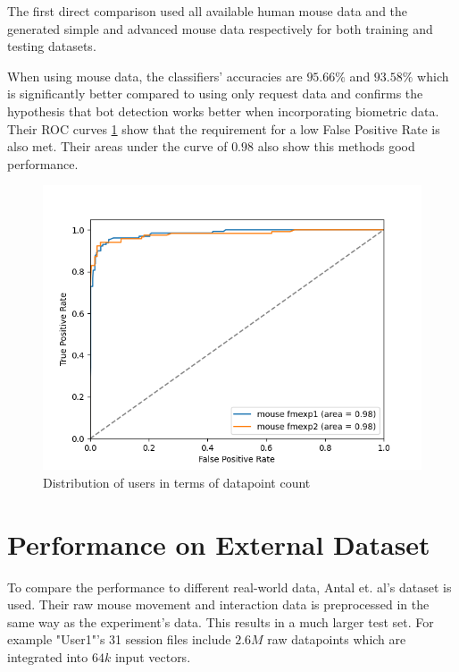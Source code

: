 \documentclass[
    fontsize=12pt,
    headings=small,
    parskip=half,           %
    bibliography=totoc,
    numbers=noenddot,       %
    open=any,               %
    final,                   %
    table
]{scrreprt}
\begin{document}
The first direct comparison used all available human mouse data and the generated simple and advanced mouse data respectively for both training and testing datasets. 

When using mouse data, the classifiers' accuracies are $95.66\%$ and $93.58\%$ which is significantly better compared to using only request data and confirms the hypothesis that bot detection works better when incorporating biometric data. Their ROC curves \ref{fig:roc_mouse_both_instances} show that the requirement for a low False Positive Rate is also met. Their areas under the curve of $0.98$ also show this methods good performance.

\begin{figure}[h]
    \includegraphics[width=\textwidth]{figures/roc_mouse_both_instances.png}
    \caption{Distribution of users in terms of datapoint count}
    \label{fig:roc_mouse_both_instances}
\end{figure}

\section{Performance on External Dataset}


To compare the performance to different real-world data, Antal et. al's dataset \cite{9111596} is used. Their raw mouse movement and interaction data is preprocessed in the same way as the experiment's data. This results in a much larger test set. For example "User1"'s 31 session files include $2.6M$ raw datapoints which are integrated into $64k$ input vectors.
\end{document}
